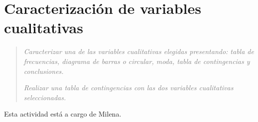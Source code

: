 \section*{Caracterización de variables cualitativas}
\begin{quotation}\emph{\textcolor{gray}{
    Caracterizar una de las variables cualitativas elegidas presentando: tabla de frecuencias, diagrama de barras o circular, moda, tabla de contingencias y conclusiones.}}\par
    \emph{\textcolor{gray}{Realizar una tabla de contingencias con las dos variables cualitativas seleccionadas.}}
\end{quotation}


Esta actividad está a cargo de Milena.